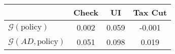 \begin{tabular}{@{}lccc@{}} 
\toprule 
                          & Check      & UI    & Tax Cut    \\  \midrule 
$\mathcal{G}(\text{policy})$ & 0.002  & 0.059  & -0.001     \\ 
$\mathcal{G}(AD,\text{policy})$ & 0.051  & 0.098  & 0.019     \\ 
\end{tabular}  
